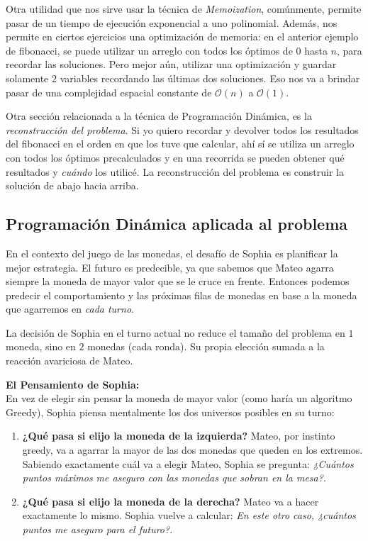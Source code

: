 Otra utilidad que nos sirve usar la técnica de \textit{Memoization}, comúnmente, permite pasar de un tiempo de ejecución exponencial a uno polinomial. Además, nos permite en ciertos ejercicios una optimización de memoria: en el anterior ejemplo de fibonacci, se puede utilizar un arreglo con todos los óptimos de $0$ hasta $n$, para recordar las soluciones. Pero mejor aún, utilizar una optimización y guardar solamente $2$ variables recordando las últimas dos soluciones. Eso nos va a brindar pasar de una complejidad espacial constante de $\mathcal{O}(n)$ a $\mathcal{O}(1)$.

Otra sección relacionada a la técnica de Programación Dinámica, es la \textit{reconstrucción del problema}. Si yo quiero recordar y devolver todos los resultados del fibonacci en el orden en que los tuve que calcular, ahí sí se utiliza un arreglo con todos los óptimos precalculados y en una recorrida se pueden obtener qué resultados y \textit{cuándo} los utilicé. La reconstrucción del problema es construir la solución de abajo hacia arriba.

\subsection{Programación Dinámica aplicada al problema}

En el contexto del juego de las monedas, el desafío de Sophia es planificar la mejor estrategia. El futuro es predecible, ya que sabemos que Mateo agarra siempre la moneda de mayor valor que se le cruce en frente. Entonces podemos predecir el comportamiento y las próximas filas de monedas en base a la moneda que agarremos en \textit{cada turno}.

La decisión de Sophia en el turno actual no reduce el tamaño del problema en $1$ moneda, sino en $2$ monedas (cada ronda). Su propia elección sumada a la reacción avariciosa de Mateo.

\textbf{El Pensamiento de Sophia:} \\
En vez de elegir sin pensar la moneda de mayor valor (como haría un algoritmo Greedy), Sophia piensa mentalmente los dos universos posibles en su turno:
\begin{enumerate}
    \item \textbf{¿Qué pasa si elijo la moneda de la izquierda?} Mateo, por instinto greedy, va a agarrar la mayor de las dos monedas que queden en los extremos. Sabiendo exactamente cuál va a elegir Mateo, Sophia se pregunta: \textit{¿Cuántos puntos máximos me aseguro con las monedas que sobran en la mesa?}.
    \item \textbf{¿Qué pasa si elijo la moneda de la derecha?} Mateo va a hacer exactamente lo mismo. Sophia vuelve a calcular: \textit{En este otro caso, ¿cuántos puntos me aseguro para el futuro?}.
\end{enumerate}

